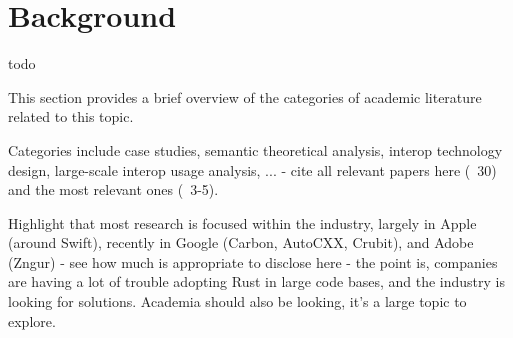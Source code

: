 \section{Background}
\label{sec:background}
todo

This section provides a brief overview of the categories of academic literature related to this topic.

Categories include case studies, semantic theoretical analysis, interop technology design, large-scale interop usage analysis, ... - cite all relevant papers here (~30) and the most relevant ones (~3-5).

Highlight that most research is focused within the industry, largely in Apple (around Swift), recently in Google (Carbon, AutoCXX, Crubit), and Adobe (Zngur) - see how much is appropriate to disclose here - the point is, companies are having a lot of trouble adopting Rust in large code bases, and the industry is looking for solutions. Academia should also be looking, it's a large topic to explore.
